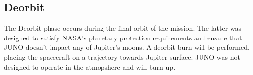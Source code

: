  \subsection{Deorbit}
The Deorbit phase occurs during the final orbit of the mission. The latter was designed to satisfy NASA's planetary protection requirements and 
ensure that JUNO doesn't impact any of Jupiter's moons. A deorbit burn will be performed, placing the spacecraft on a trajectory towards Jupiter surface. 
JUNO was not designed to operate in the atmopshere and will burn up.





